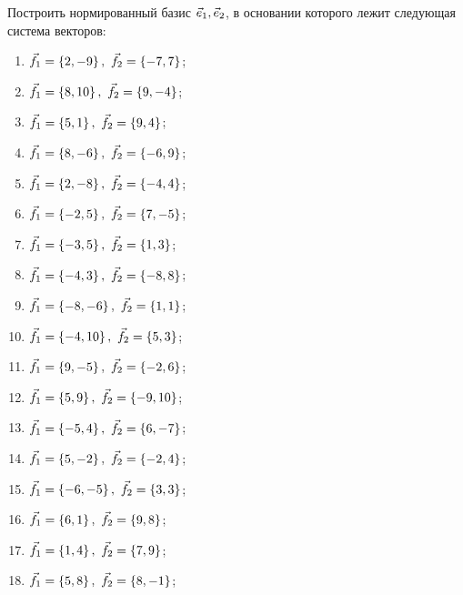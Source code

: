 	\pagebreak
	Построить нормированный базис $\ve_1, \ve_2$, в основании которого лежит следующая система векторов:

	\begin{multicols}{2}
		\begin{enumerate}
			\setcounter{enumi}{\value{tasks}}

			\item \( \displaystyle \vf_1 = \bracs{2, -9}, ~ \vf_2 = \bracs{-7, 7} \);
			\item \( \displaystyle \vf_1 = \bracs{8, 10}, ~ \vf_2 = \bracs{9, -4} \);
			\item \( \displaystyle \vf_1 = \bracs{5, 1}, ~ \vf_2 = \bracs{9, 4} \);
			\item \( \displaystyle \vf_1 = \bracs{8, -6}, ~ \vf_2 = \bracs{-6, 9} \);
			\item \( \displaystyle \vf_1 = \bracs{2, -8}, ~ \vf_2 = \bracs{-4, 4} \);
			\item \( \displaystyle \vf_1 = \bracs{-2, 5}, ~ \vf_2 = \bracs{7, -5} \);
			\item \( \displaystyle \vf_1 = \bracs{-3, 5}, ~ \vf_2 = \bracs{1, 3} \);
			\item \( \displaystyle \vf_1 = \bracs{-4, 3}, ~ \vf_2 = \bracs{-8, 8} \);
			\item \( \displaystyle \vf_1 = \bracs{-8, -6}, ~ \vf_2 = \bracs{1, 1} \);
			\item \( \displaystyle \vf_1 = \bracs{-4, 10}, ~ \vf_2 = \bracs{5, 3} \);
			\item \( \displaystyle \vf_1 = \bracs{9, -5}, ~ \vf_2 = \bracs{-2, 6} \);
			\item \( \displaystyle \vf_1 = \bracs{5, 9}, ~ \vf_2 = \bracs{-9, 10} \);
			\item \( \displaystyle \vf_1 = \bracs{-5, 4}, ~ \vf_2 = \bracs{6, -7} \);
			\item \( \displaystyle \vf_1 = \bracs{5, -2}, ~ \vf_2 = \bracs{-2, 4} \);
			\item \( \displaystyle \vf_1 = \bracs{-6, -5}, ~ \vf_2 = \bracs{3, 3} \);
			\item \( \displaystyle \vf_1 = \bracs{6, 1}, ~ \vf_2 = \bracs{9, 8} \);
			\item \( \displaystyle \vf_1 = \bracs{1, 4}, ~ \vf_2 = \bracs{7, 9} \);
			\item \( \displaystyle \vf_1 = \bracs{5, 8}, ~ \vf_2 = \bracs{8, -1} \);

			\setcounter{tasks}{\value{enumi}}
		\end{enumerate}
	\end{multicols}

